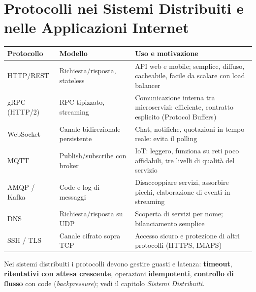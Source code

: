 \section[Protocolli nei Sistemi Distribuiti]{Protocolli nei Sistemi Distribuiti e nelle Applicazioni Internet}
\begin{center}
\small
\begin{tabularx}{\textwidth}{@{}>{\raggedright\arraybackslash}p{2.4cm}>{\raggedright\arraybackslash}p{3.2cm}X@{}}
\toprule
\textbf{Protocollo} & \textbf{Modello} & \textbf{Uso e motivazione} \\
\midrule
HTTP/REST & Richiesta/risposta, stateless & API web e mobile; semplice, diffuso, cacheabile, facile da scalare con load balancer \\
gRPC (HTTP/2) & RPC tipizzato, streaming & Comunicazione interna tra microservizi: efficiente, contratto esplicito (Protocol Buffers) \\
WebSocket & Canale bidirezionale persistente & Chat, notifiche, quotazioni in tempo reale: evita il polling \\
MQTT & Publish/subscribe con broker & IoT: leggero, funziona su reti poco affidabili, tre livelli di qualità del servizio \\
AMQP / Kafka & Code e log di messaggi & Disaccoppiare servizi, assorbire picchi, elaborazione di eventi in streaming \\
DNS & Richiesta/risposta su UDP & Scoperta di servizi per nome; bilanciamento semplice \\
SSH / TLS & Canale cifrato sopra TCP & Accesso sicuro e protezione di altri protocolli (HTTPS, IMAPS) \\
\bottomrule
\end{tabularx}
\end{center}
Nei sistemi distribuiti i protocolli devono gestire guasti e latenza: \textbf{timeout}, \textbf{ritentativi con attesa crescente}, operazioni \textbf{idempotenti}, \textbf{controllo di flusso} con code (\emph{backpressure}); vedi il capitolo \emph{Sistemi Distribuiti}.

